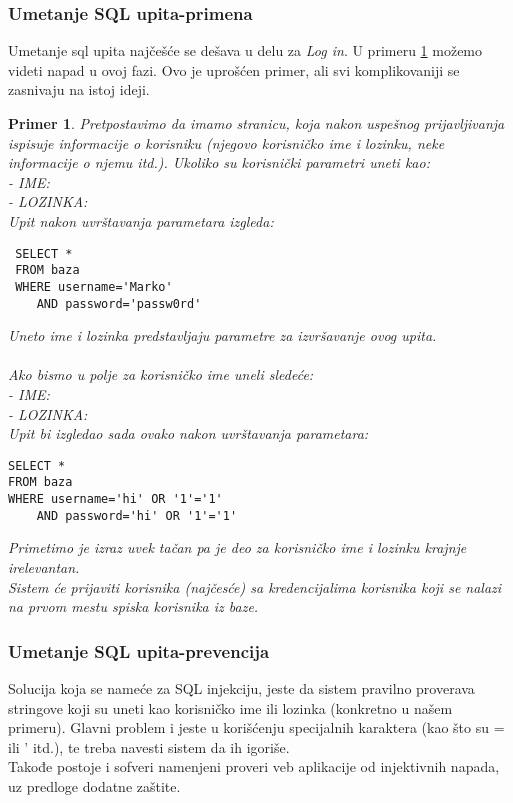 \documentclass[a4paper]{article}
\newtheorem{primer}{Primer}[section]
\begin{document}
\subsubsection{Umetanje SQL upita-primena}

Umetanje sql upita najčešće se dešava u delu za \textit{Log in}. U primeru \ref{primer2} možemo videti napad u ovoj fazi. Ovo je uprošćen primer, ali svi komplikovaniji se zasnivaju na istoj ideji.
\begin{primer}
\label{primer2}
Pretpostavimo da imamo stranicu, koja nakon uspešnog prijavljivanja ispisuje informacije o korisniku (njegovo korisničko ime i lozinku, neke informacije o njemu itd.). Ukoliko su korisnički parametri uneti kao:\\
- IME: \\
- LOZINKA: \\
Upit nakon uvrštavanja parametara izgleda:
\begin{lstlisting}
 SELECT * 
 FROM baza 
 WHERE username='Marko'
 	AND password='passw0rd'
\end{lstlisting}
Uneto ime i lozinka predstavljaju parametre za izvršavanje ovog upita.\\\\
Ako bismo u polje za korisničko ime uneli sledeće:\\
- IME: \\
- LOZINKA: \\
Upit bi izgledao sada ovako nakon uvrštavanja parametara:
\begin{lstlisting}
SELECT * 
FROM baza 
WHERE username='hi' OR '1'='1' 
	AND password='hi' OR '1'='1'
\end{lstlisting}
Primetimo je izraz  uvek tačan pa je deo za korisničko ime i lozinku krajnje irelevantan.\\
Sistem će prijaviti korisnika (najčesće) sa kredencijalima korisnika koji se nalazi na prvom mestu spiska korisnika iz baze.\\
\end{primer}

\subsubsection{Umetanje SQL upita-prevencija}

Solucija koja se nameće za SQL injekciju, jeste da sistem pravilno proverava stringove koji su uneti kao korisničko ime ili lozinka (konkretno u našem primeru). Glavni problem i jeste u korišćenju specijalnih karaktera (kao što su = ili ' itd.), te treba navesti sistem da ih igoriše.\\
Takođe postoje i sofveri namenjeni proveri  veb aplikacije od injektivnih napada, uz predloge dodatne zaštite.
\end{document}
